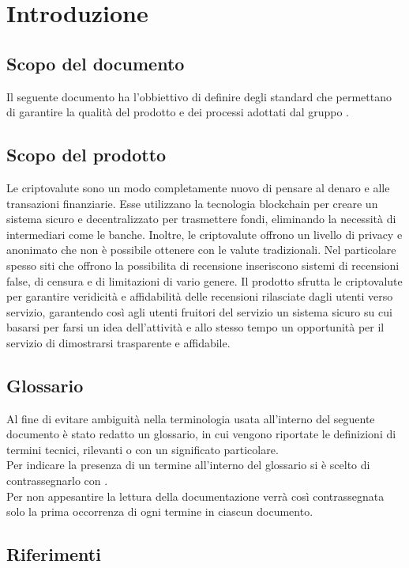 \section{Introduzione}


\subsection{Scopo del documento}
Il seguente documento ha l'obbiettivo di definire degli standard che permettano
di garantire la qualità del prodotto e dei processi adottati dal gruppo \groupName. \\ 

\subsection{Scopo del prodotto}
Le criptovalute sono un modo completamente nuovo di pensare al denaro e alle transazioni 
finanziarie. Esse utilizzano la tecnologia blockchain per creare un sistema sicuro e 
decentralizzato per trasmettere fondi, eliminando la necessità di intermediari come le banche.
Inoltre, le criptovalute offrono un livello di privacy e anonimato che non è possibile 
ottenere con le valute tradizionali.
Nel particolare spesso siti che offrono la possibilita di recensione inseriscono
sistemi di recensioni false, di censura e di limitazioni di vario genere.
Il prodotto sfrutta le criptovalute per garantire veridicità e affidabilità 
delle recensioni rilasciate dagli utenti verso servizio, garantendo così agli utenti fruitori
del servizio un sistema sicuro su cui basarsi per farsi un idea dell'attività e allo stesso tempo
un opportunità per il servizio di dimostrarsi trasparente e affidabile. 

\subsection{Glossario}
Al fine di evitare ambiguità nella terminologia usata all'interno del seguente
documento è stato redatto un glossario, in cui vengono riportate le definizioni
di termini tecnici, rilevanti o con un significato particolare. \\ Per indicare
la presenza di un termine all'interno del glossario si è scelto di
contrassegnarlo con \glo.\\ Per non appesantire la lettura della documentazione
verrà così contrassegnata solo la prima occorrenza di ogni termine in ciascun
documento.

\subsection{Riferimenti}

